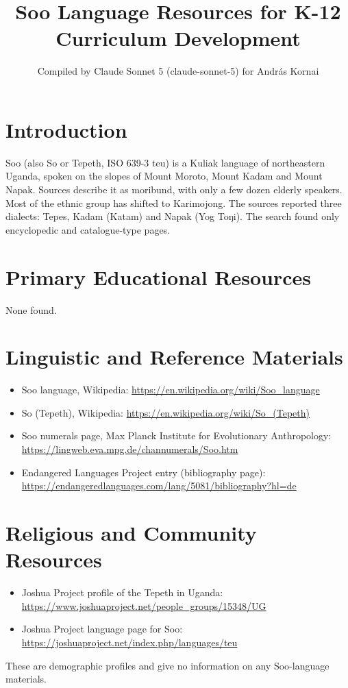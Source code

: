 \documentclass[12pt]{article}
\title{Soo Language Resources for K-12 Curriculum Development}
\author{Compiled by Claude Sonnet 5 (claude-sonnet-5) for Andr\'as Kornai}
\date{}
\begin{document}
\maketitle

\section{Introduction}
Soo (also So or Tepeth, ISO 639-3 teu) is a Kuliak language of northeastern Uganda, spoken on the slopes of Mount Moroto, Mount Kadam and Mount Napak. Sources describe it as moribund, with only a few dozen elderly speakers. Most of the ethnic group has shifted to Karimojong. The sources reported three dialects: Tepes, Kadam (Katam) and Napak (Yog Toŋi). The search found only encyclopedic and catalogue-type pages.

\section{Primary Educational Resources}
None found.

\section{Linguistic and Reference Materials}
\begin{itemize}
\item Soo language, Wikipedia: \url{https://en.wikipedia.org/wiki/Soo_language}
\item So (Tepeth), Wikipedia: \url{https://en.wikipedia.org/wiki/So_(Tepeth)}
\item Soo numerals page, Max Planck Institute for Evolutionary Anthropology: \url{https://lingweb.eva.mpg.de/channumerals/Soo.htm}
\item Endangered Languages Project entry (bibliography page): \url{https://endangeredlanguages.com/lang/5081/bibliography?hl=de}
\end{itemize}

\section{Religious and Community Resources}
\begin{itemize}
\item Joshua Project profile of the Tepeth in Uganda: \url{https://www.joshuaproject.net/people_groups/15348/UG}
\item Joshua Project language page for Soo: \url{https://joshuaproject.net/index.php/languages/teu}
\end{itemize}
These are demographic profiles and give no information on any Soo-language materials.
\end{document}
